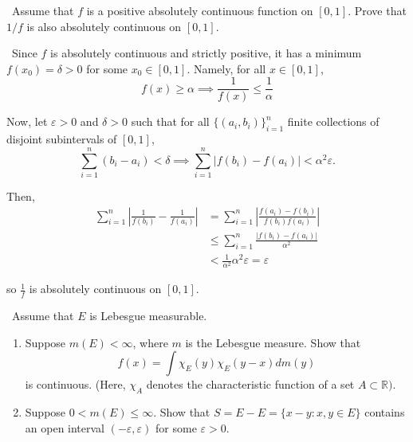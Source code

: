 \documentclass[12pt]{Homework}
\begin{document}
\begin{problem} $\,$
Assume that $f$ is a positive absolutely continuous function on $[0,1]$. Prove that $1/f$ is also absolutely continuous on $[0,1]$.
\end{problem}


\begin{solution}$\,$
Since $f$ is absolutely continuous and strictly positive, it has a minimum $f(x_0)=\delta>0$ for some $x_0\in[0,1].$ Namely, for all $x\in[0,1]$, $$f(x)\ge\alpha\implies \frac{1}{f(x)}\le \frac{1}{\alpha}$$

Now, let $\varepsilon>0$ and $\delta>0$ such that for all $\{(a_i,b_i)\}_{i=1}^n$ finite collections of disjoint subintervals of $[0,1]$, $$\sum_{i=1}^n(b_i-a_i)<\delta\implies \sum_{i=1}^n|f(b_i)-f(a_i)|<\alpha^2\varepsilon.$$

Then, \begin{align*}
    \sum_{i=1}^n\left|\frac{1}{f(b_i)}-\frac{1}{f(a_i)}\right|&=\sum_{i=1}^n\left|\frac{f(a_i)-f(b_i)}{f(b_i)f(a_i)}\right|\\
    &\le\sum_{i=1}^n\frac{|f(b_i)-f(a_i)|}{\alpha^2}\\
    &<\frac{1}{\alpha^2}\alpha^2\varepsilon=\varepsilon
\end{align*}

so $\frac{1}{f}$ is absolutely continuous on $[0,1].$
\end{solution}
\newpage




\begin{problem} $\,$
Assume that $E$ is Lebesgue measurable. 
\begin{enumerate}[label=(\alph*)]
    \item Suppose $m(E)<\infty$, where $m$ is the Lebesgue measure. Show that $$f(x)=\int\chi_E(y)\chi_E(y-x)dm(y)$$ is continuous. (Here, $\chi_A$ denotes the characteristic function of a set $A\subset\mathbb{R})$.
    \item Suppose $0<m(E)\le\infty$. Show that $S=E-E=\{x-y:x,y\in E\}$ contains an open interval $(-\varepsilon,\varepsilon)$ for some $\varepsilon>0$.
\end{enumerate}
\end{problem}
\end{document}
